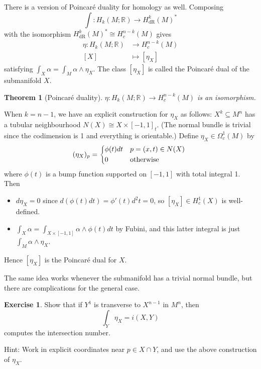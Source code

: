 \documentclass{article}
\newtheorem*{theorem}{Theorem}
\theoremstyle{definition}
\newtheorem*{exercise}{Exercise}
\newcommand{\dR}{\mathrm{dR}}
\newcommand{\R}{\mathbb{R}}
\begin{document}
There is a version of Poincar\'e duality for homology as well. Composing
\begin{equation*}
    \int : H_k(M;\R) \to H^k_\dR(M)^*
\end{equation*}
with the isomorphism $H^k_\dR(M)^*\cong H^{n-k}_c(M)$ gives
\begin{align*}
    \eta : H_k(M;\R) &\to H^{n-k}_c(M) \\
    [X] &\mapsto [\eta_X]
\end{align*}
satisfying $\int_X\alpha=\int_M\alpha\wedge\eta_X$. The class $[\eta_X]$ is
called the Poincar\'e dual of the submanifold $X$.

\begin{theorem}[Poincar\'e duality]
    $\eta:H_k(M;\R)\to H^{n-k}_c(M)$ is an isomorphism.
\end{theorem}

When $k=n-1$, we have an explicit construction for $\eta_X$ as follows:
$X^k\subseteq M^n$ has a tubular neighbourhood $N(X)\cong X\times[-1,1]_t$. (The
normal bundle is trivial since the codimension is 1 and everything is
orientable.) Define $\eta_X\in\Omega^1_c(M)$ by
\begin{equation*}
    (\eta_X)_p = \begin{dcases*}
        \phi(t)dt & $p=(x,t)\in N(X)$ \\
        0 & otherwise
    \end{dcases*}
\end{equation*}
where $\phi(t)$ is a bump function supported on $[-1,1]$ with total integral 1.
Then
\begin{itemize}
    \item $d\eta_X=0$ since $d(\phi(t)dt)=\phi'(t)d^2t=0$, so
        $[\eta_X]\in H^1_c(X)$ is well-defined.

    \item $\int_X\alpha=\int_{X\times[-1,1]}\alpha\wedge\phi(t)dt$ by Fubini,
        and this latter integral is just $\int_M\alpha\wedge\eta_X$.
\end{itemize}
Hence $[\eta_X]$ is the Poincar\'e dual for $X$.

The same idea works whenever the submanifold has a trivial normal bundle, but
there are complications for the general case.

\begin{exercise}
    Show that if $Y^1$ is transverse to $X^{n-1}$ in $M^n$, then
    \begin{equation*}
        \int_Y\eta_X = i(X,Y)
    \end{equation*}
    computes the intersection number.

    Hint: Work in explicit coordinates near $p\in X\cap Y$, and use the above
    construction of $\eta_X$.
\end{exercise}
\end{document}
